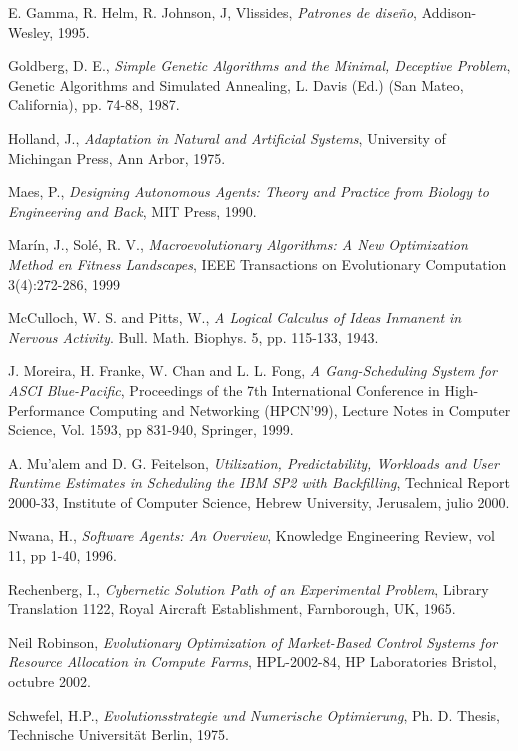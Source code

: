 \begin{thebibliography}{999}
E. Gamma, R. Helm, R. Johnson, J, Vlissides, {\it Patrones de diseño}, Addison-Wesley, 1995.

Goldberg, D. E., 
{\it Simple Genetic Algorithms and the Minimal, Deceptive Problem}, Genetic Algorithms and Simulated Annealing, L. Davis (Ed.) (San Mateo, California), pp. 74-88, 1987.

Holland, J., {\it Adaptation in Natural and Artificial Systems}, 
University of Michingan Press, Ann Arbor, 1975.

Maes, P., {\it Designing Autonomous Agents: Theory and Practice from Biology to
Engineering and Back}, MIT Press, 1990.

Marín, J., Solé, R. V., {\it Macroevolutionary Algorithms: A New Optimization
Method en Fitness Landscapes}, IEEE Transactions on Evolutionary 
Computation 3(4):272-286, 1999

McCulloch, W. S. and Pitts, W., 
{\it A Logical Calculus of Ideas Inmanent in Nervous Activity}. Bull. Math. Biophys. 5, pp. 115-133, 1943.

J. Moreira, H. Franke, W. Chan and L. L. Fong, 
{\it A Gang-Scheduling System for ASCI Blue-Pacific}, 
Proceedings of the 7th International Conference in High-Performance Computing 
and Networking (HPCN'99), Lecture Notes in Computer Science, Vol. 1593, pp 831-940, Springer, 1999.

A. Mu'alem and D. G. Feitelson, 
{\it Utilization, Predictability, Workloads and User Runtime Estimates in 
Scheduling the IBM SP2 with Backfilling}, 
Technical Report 2000-33, Institute of Computer Science, 
Hebrew University, Jerusalem, julio 2000.

Nwana, H., {\it Software Agents: An Overview}, Knowledge Engineering Review, vol
11, pp 1-40, 1996.

Rechenberg, I., {\it Cybernetic Solution Path of an Experimental Problem},
 Library Translation 1122, Royal Aircraft Establishment, Farnborough, UK, 1965. 

Neil Robinson, {\it Evolutionary Optimization of Market-Based 
Control Systems for Resource Allocation in Compute Farms}, 
HPL-2002-84, HP Laboratories Bristol, octubre 2002.

Schwefel, H.P., {\it Evolutionsstrategie und Numerische Optimierung}, 
Ph. D. Thesis, Technische Universität Berlin, 1975.


\end{thebibliography}
